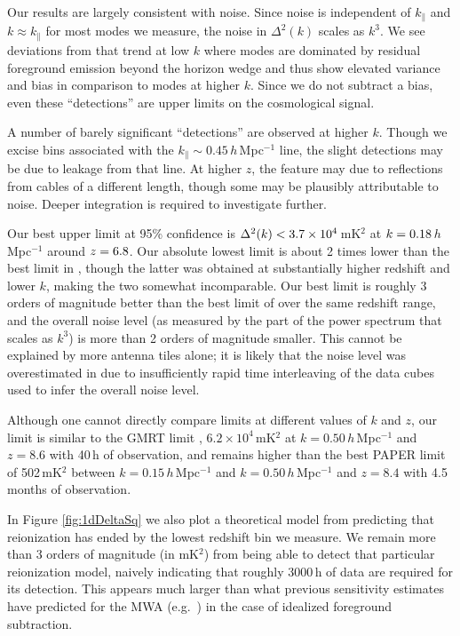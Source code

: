 Our results are largely consistent with noise. Since noise is independent of $k_\|$ and $k\approx k_\|$ for most modes we measure, the noise in $\Delta^2(k)$ scales as $k^3$. We see deviations from that trend at low $k$ where modes are dominated by residual foreground emission beyond the horizon wedge and thus show elevated variance and bias in comparison to modes at higher $k$. Since we do not subtract a bias, even these ``detections'' are upper limits on the cosmological signal.

A number of barely significant ``detections'' are observed at higher $k$. Though we excise bins associated with the $k_\| \sim 0.45$\,$h$\,Mpc$^{-1}$ line, the slight detections may be due to leakage from that line. At higher $z$, the feature may due to reflections from cables of a different length, though some may be plausibly attributable to noise. Deeper integration is required to investigate further. 

Our best upper limit at 95\% confidence is $\Delta^2(k) < 3.7\times 10^4$\,mK$^2$ at $k = 0.18$\,$h$\,Mpc$^{-1}$ around $z = 6.8$. Our absolute lowest limit is about 2 times lower than the best limit in \cite{X13}, though the latter was obtained at substantially higher redshift and lower $k$, making the two somewhat incomparable. Our best limit is roughly 3 orders of magnitude better than the best limit of \cite{X13} over the same redshift range, and the overall noise level (as measured by the part of the power spectrum that scales as $k^3$) is more than 2 orders of magnitude smaller. This cannot be explained by more antenna tiles alone; it is likely that the noise level was overestimated in \cite{X13} due to insufficiently rapid time interleaving of the data cubes used to infer the overall noise level.

Although one cannot directly compare limits at different values of $k$ and $z$, our limit is similar to the GMRT limit \cite{gmrtsignalloss}, $6.2\times 10^4$\,mK$^2$ at $k = 0.50$\,$h$\,Mpc$^{-1}$ and $z=8.6$ with 40\,h of observation, and remains higher than the best PAPER limit \cite{PAPER64Limits} of 502\,mK$^2$ between $k = 0.15$\,$h$\,Mpc$^{-1}$ and $k=0.50$\,$h$\,Mpc$^{-1}$ and $z=8.4$ with 4.5 months of observation.
 
In Figure \ref{fig:1dDeltaSq} we also plot a theoretical model from \cite{BarkanaPS2009} predicting that reionization has ended by the lowest redshift bin we measure. We remain more than 3 orders of magnitude (in mK$^2$) from being able to detect that particular reionization model, naively indicating that roughly 3000\,h of data are required for its detection. This appears much larger than what previous sensitivity estimates have predicted for the MWA (e.g.~\cite{beardsley13}) in the case of idealized foreground subtraction. 
 
